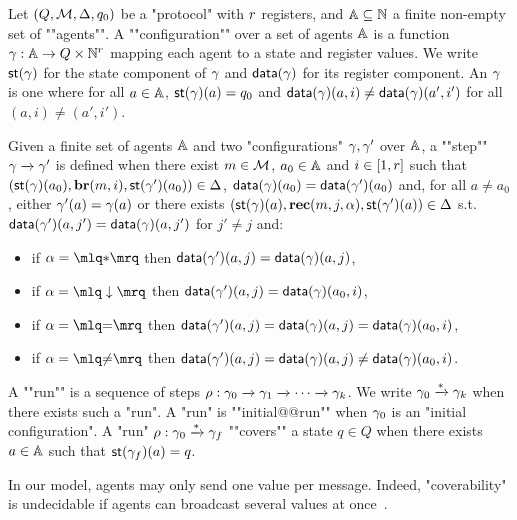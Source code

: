 \begin{definition}[Semantics]
	Let $(Q,\mathcal{M}, \Delta, q_0)$ be a "protocol" with $r$ registers, and $\mathbb{A} \subseteq \mathbb{N}$ a finite non-empty set of ""agents"".
	A ""configuration"" over a set of agents $\mathbb{A}$ is a function $\gamma : \mathbb{A} \to Q \times \mathbb{N}^{r}$ mapping each agent to a state and register values. 
	We write $\mathsf{st}(\gamma)$ for the state component of $\gamma$ and $\mathsf{data}(\gamma)$ for its register component.
	An  $\gamma$ is one where for all $a \in \mathbb{A}$, $\mathsf{st}(\gamma)(a) = q_0$ and $\mathsf{data}(\gamma)(a, i) \neq \mathsf{data}(\gamma)(a', i')$ for all $(a,i) \neq (a', i')$.
	
	\AP Given a finite set of agents $\mathbb{A}$ and two "configurations" $\gamma, \gamma'$ over $\mathbb{A}$, a ""step"" $\gamma \xrightarrow{} \gamma'$ is defined when there exist $m \in \mathcal{M}$, $a_0 \in \mathbb{A}$ and $i \in [1,r]$ such that \linebreak $(\mathsf{st}(\gamma)(a_0),\textbf{br}(m, i), \mathsf{st}(\gamma')(a_0)) \in \Delta$, $\mathsf{data}(\gamma)(a_0) = \mathsf{data}(\gamma')(a_0)$ and, for all $a \ne a_0$, either $\gamma'(a) = \gamma(a)$ or there exists $(\mathsf{st}(\gamma)(a),\textbf{rec}(m, j, \alpha),\mathsf{st}(\gamma')(a)) \in \Delta$
		s.t. $\mathsf{data}(\gamma')(a, j') = \mathsf{data}(\gamma)(a, j')$ for $j' \neq j$ and:
		\begin{itemize}
				\item if $\anact = \quotemarks{\dummyact}$ 
				then $\mathsf{data}(\gamma')(a,j) = \mathsf{data}(\gamma)(a,j)$,
				\item if $\anact = \quotemarks{\enregact}$ then $\mathsf{data}(\gamma')(a,j) = \mathsf{data}(\gamma)(a_0,i)$,
				\item if $\anact = \quotemarks{\eqtestact}$ then $\mathsf{data}(\gamma')(a,j) = \mathsf{data}(\gamma)(a,j) =\mathsf{data}(\gamma)(a_0,i)$,
				\item if $\anact = \quotemarks{\diseqtestact}$ then $\mathsf{data}(\gamma')(a,j) = \mathsf{data}(\gamma)(a,j) \ne \mathsf{data}(\gamma)(a_0,i)$.
			\end{itemize}
	
	\AP A ""run"" is a sequence of steps $\rho : \gamma_0 \xrightarrow{} \gamma_1 \xrightarrow{} \cdots \xrightarrow{} \gamma_k$. 
	We write $\gamma_0 \xrightarrow{*} \gamma_k$ when there exists such a "run".
	A "run" is ""initial@@run"" when $\gamma_0$ is an "initial configuration".  
	A "run" $\rho: \gamma_0 \xrightarrow{*} \gamma_f$ ""covers"" a state $q \in Q$ when there exists $a \in \mathbb{A}$ such that $\mathsf{st}(\gamma_f)(a) = q$. 
\end{definition}
\begin{remark}
\label{rem:several_values_per_message}
In our model, agents may only send one value per message. Indeed, "coverability" is undecidable if agents can broadcast several values at once~\cite{DelzannoST13}.
\end{remark}

